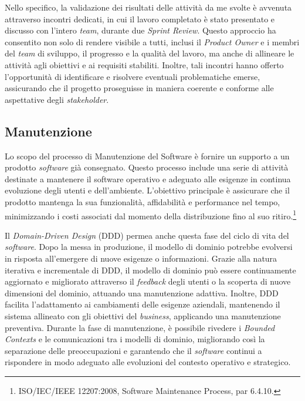         \noindent Nello specifico, la validazione dei risultati delle attività da me svolte è avvenuta attraverso incontri dedicati, in cui il lavoro completato è stato presentato e discusso con l'intero \textit{team}, durante due \textit{Sprint Review}. Questo approccio ha consentito non solo di rendere visibile a tutti, inclusi il \textit{Product Owner} e i membri del \textit{team} di sviluppo, il progresso e la qualità del lavoro, ma anche di allineare le attività agli obiettivi e ai requisiti stabiliti. Inoltre, tali incontri hanno offerto l'opportunità di identificare e risolvere eventuali problematiche emerse, assicurando che il progetto proseguisse in maniera coerente e conforme alle aspettative degli \textit{stakeholder}.
        
        \subsection{Manutenzione}
        Lo scopo del processo di Manutenzione del Software è fornire un supporto a un prodotto \textit{software} già consegnato. Questo processo include una serie di attività destinate a mantenere il software operativo e adeguato alle esigenze in continua evoluzione degli utenti e dell'ambiente. L'obiettivo principale è assicurare che il prodotto mantenga la sua funzionalità, affidabilità e performance nel tempo, minimizzando i costi associati dal momento della distribuzione fino al suo ritiro.\footnote{ISO/IEC/IEEE 12207:2008, Software Maintenance Process, par 6.4.10.}
        
        \noindent Il \textit{Domain-Driven Design} (DDD) permea anche questa fase del ciclo di vita del \textit{software}. Dopo la messa in produzione, il modello di dominio potrebbe evolversi in risposta all'emergere di nuove esigenze o informazioni. Grazie alla natura iterativa e incrementale di DDD, il modello di dominio può essere continuamente aggiornato e migliorato attraverso il \textit{feedback} degli utenti o la scoperta di nuove dimensioni del dominio, attuando una manutenzione adattiva. Inoltre, DDD facilita l'adattamento ai cambiamenti delle esigenze aziendali, mantenendo il sistema allineato con gli obiettivi del \textit{business}, applicando una manutenzione preventiva. Durante la fase di manutenzione, è possibile rivedere i \textit{Bounded Contexts} e le comunicazioni tra i modelli di dominio, migliorando così la separazione delle preoccupazioni e garantendo che il \textit{software} continui a rispondere in modo adeguato alle evoluzioni del contesto operativo e strategico.

